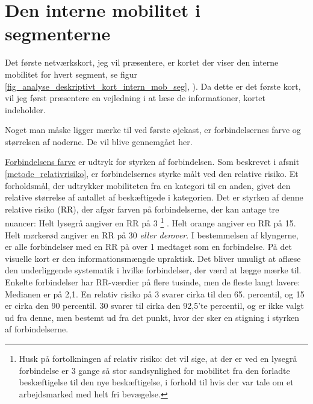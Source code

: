 \section{Den interne mobilitet i segmenterne \label{analyse_deskriptivt_within_mob_seg}}


Det første netværkskort, jeg vil præsentere, er kortet der viser den interne mobilitet for hvert segment,  se figur \ref{fig_analyse_deskriptivt_kort_intern_mob_seg}, ). %
Da dette er det første kort, vil jeg først præsentere en vejledning i at læse de informationer, kortet indeholder. 

Noget man måske ligger mærke til ved første øjekast, er forbindelsernes farve og størrelsen af noderne. De vil blive gennemgået her.

\underline{Forbindelsens farve} er udtryk for styrken af forbindelsen. Som beskrevet i afsnit \ref{metode_relativrisiko}, er forbindelsernes styrke målt ved den relative risiko. Et forholdsmål, der udtrykker mobiliteten fra en kategori til en anden, givet den relative størrelse af antallet af beskæftigede i kategorien. Det er styrken af denne relative risiko (RR), der afgør farven på forbindelserne, der kan antage tre nuancer: Helt lysegrå angiver en RR på 3%
%
\footnote{Husk på fortolkningen af relativ risiko:  det vil sige, at der er ved en lysegrå forbindelse er 3 gange så stor sandsynlighed for mobilitet fra den forladte beskæftigelse til den nye beskæftigelse, i forhold til hvis der var tale om et arbejdsmarked med helt fri bevægelse.}%
%
. Helt orange angiver en RR på 15. Helt mørkerød angiver en RR på 30 \emph{ eller derover}. I bestemmelsen af klyngerne, er alle forbindelser med en RR på over 1 medtaget som en forbindelse. På det visuelle kort er den informationsmængde upraktisk. Det bliver umuligt at aflæse den underliggende systematik i hvilke forbindelser, der værd at lægge mærke til. Enkelte forbindelser har RR-værdier på flere tusinde, men de fleste langt lavere: Medianen er på 2,1. En relativ risiko på 3 svarer cirka til den 65. percentil, og 15 er cirka den 90 percentil. 30 svarer til cirka den 92,5'te percentil, og er ikke valgt ud fra denne, men bestemt ud fra det punkt, hvor der sker en stigning i styrken af forbindelserne. 

